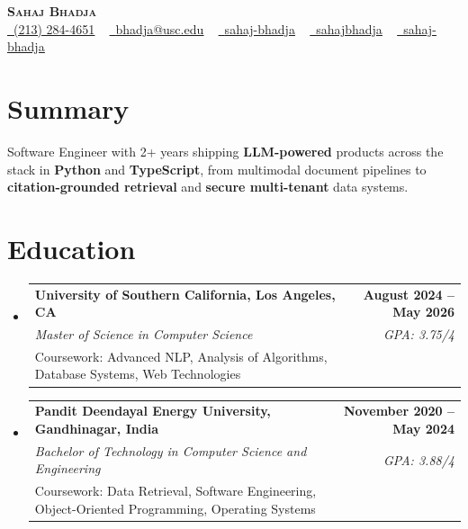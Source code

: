 \documentclass[letterpaper,10pt]{article}
\makeatletter
\newcommand{\sectionGap}{\vspace{-8pt}}
\newcommand{\resumeEduSubheading}[5]{\vspace{-1pt}\item\begin{tabular*}{1.0\textwidth}[t]{l@{\extracolsep{\fill}}r}\textbf{#1} & \textbf{\small #2} \\\textit{\small #3} & \textit{\small #4} \\\small #5 & \\\end{tabular*}\vspace{-4pt}}
\newcommand{\resumeSubHeadingListStart}{\begin{itemize}[leftmargin=0.0in, label={}]}
\newcommand{\resumeSubHeadingListEnd}{\end{itemize}}
\makeatother
\begin{document}
\begin{center}
{\Huge \scshape \textbf{Sahaj Bhadja}} \\ \vspace{1pt}
\small \href{tel:2132844651}{\faPhone\ \underline{(213) 284-4651}} ~ \href{mailto:bhadja@usc.edu}{\raisebox{-0.2\height}\faEnvelope\ \underline{bhadja@usc.edu}} ~
\href{https://www.linkedin.com/in/sahaj-bhadja/}{\raisebox{-0.2\height}\faLinkedin\ \underline{sahaj-bhadja}} ~ \href{https://github.com/SAHAJ-BHADJA}{\raisebox{-0.2\height}\faGithub\ \underline{sahajbhadja}} ~
\href{https://sahaj-bhadja.vercel.app/}{\raisebox{-0.2\height}\faGlobe\ \underline{sahaj-bhadja}}
\end{center}
\vspace{-16pt}
\section{Summary}
\begin{itemize}[leftmargin=0.15in, label={}]
\small{\item{Software Engineer with 2+ years shipping \textbf{LLM-powered} products across the stack in \textbf{Python} and \textbf{TypeScript}, from multimodal document pipelines to \textbf{citation-grounded retrieval} and \textbf{secure multi-tenant} data systems.}}
\end{itemize}
\sectionGap
\section{Education}
\resumeSubHeadingListStart
\resumeEduSubheading{University of Southern California, Los Angeles, CA}{August 2024 -- May 2026}{Master of Science in Computer Science}{GPA: 3.75/4}{Coursework: Advanced NLP, Analysis of Algorithms, Database Systems, Web Technologies}
\resumeEduSubheading{Pandit Deendayal Energy University, Gandhinagar, India}{November 2020 -- May 2024}{Bachelor of Technology in Computer Science and Engineering}{GPA: 3.88/4}{Coursework: Data Retrieval, Software Engineering, Object-Oriented Programming, Operating Systems}
\resumeSubHeadingListEnd
\sectionGap
\end{document}
